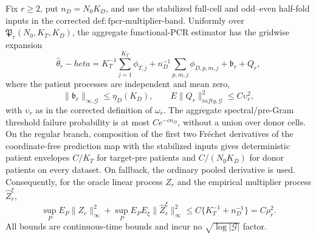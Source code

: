 Fix \(r\ge2\), put \(n_D=N_0K_D\), and use the stabilized full-cell and odd--even half-fold inputs in the corrected \(\mathrm{def:fpcr\mbox{-}multiplier\mbox{-}band}\). Uniformly over \(\mathfrak P_r(N_0,K_T,K_D)\), the aggregate functional-PCR estimator has the gridwise expansion
\[
 \widehat\theta_r-  heta
 =K_T^{-1}\sum_{j=1}^{K_T}\phi_{T,j}
 +n_D^{-1}\sum_{p,m,j}\phi_{D,p,m,j}
 +\mathfrak b_r+Q_r,
\]
where the patient processes are independent and mean zero,
\[
 \|\mathfrak b_r\|_{\infty,\mathcal G}\le\eta_D(K_D),
 \qquad E\|Q_r\|_{infty,\mathcal G}^2\le C\upsilon_r^2,
\]
with \(\upsilon_r\) as in the corrected definition of \(\omega_r\). The aggregate spectral/pre-Gram threshold failure probability is at most \(Ce^{-cn_D}\), without a union over donor cells. On the regular branch, composition of the first two Fr\'echet derivatives of the coordinate-free prediction map with the stabilized inputs gives deterministic patient envelopes \(C/K_T\) for target-pre patients and \(C/(N_0K_D)\) for donor patients on every dataset. On fallback, the ordinary pooled derivative is used. Consequently, for the oracle linear process \(Z_r\) and the empirical multiplier process \(\widehat Z_r^\xi\),
\[
 \sup_PE_P\|Z_r\|_\infty^2
 +\sup_PE_PE_\xi\|\widehat Z_r^\xi\|_\infty^2
 \le C\{K_T^{-1}+n_D^{-1}\}=C\rho_r^2.
\]
All bounds are continuous-time bounds and incur no \(\sqrt{\log|\mathcal G|}\) factor.